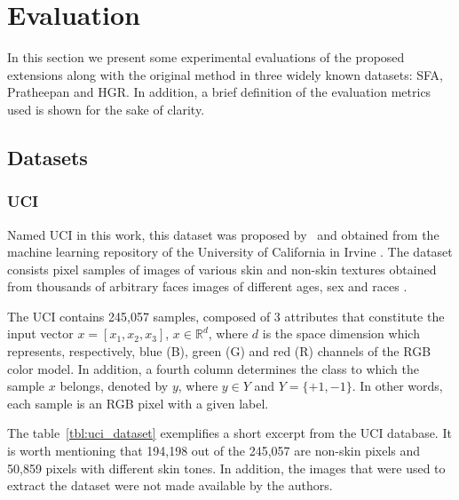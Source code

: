 \chapter{Evaluation}
\label{cap:experimentos}

In this section we present some experimental evaluations of the proposed extensions along with the original method in three widely known datasets: SFA, Pratheepan and HGR. In addition, a brief definition of the evaluation metrics used is shown for the sake of clarity.


\section{Datasets}
\label{sec:datasets}

\subsection{UCI}
\label{sec:datasets_uci}
Named UCI in this work, this dataset was proposed by~\citet{uci-skin-dataset:12} and obtained from the machine learning repository of the University of California in Irvine \citep{lichman:13}. The dataset consists pixel samples of images of various skin and non-skin textures obtained from thousands of arbitrary faces images of different ages, sex and races \citep{pal-texas:04, feret:96}.

The UCI contains 245,057 samples, composed of 3 attributes that constitute the input vector $x = [x_1, x_2, x_3]$, $x \in \mathbb{R}^{d}$, where $d$ is the space dimension which represents, respectively, blue (B), green (G) and red (R) channels of the RGB color model. In addition, a fourth column determines the class to which the sample $x$ belongs, denoted by $y$, where $y \in Y$ and $Y = \{+1, -1\}$. In other words, each sample is an RGB pixel with a given label.

The table~\ref{tbl:uci_dataset} exemplifies a short excerpt from the UCI database. It is worth mentioning that 194,198 out of the 245,057 are non-skin pixels and 50,859 pixels with different skin tones. In addition, the images that were used to extract the dataset were not made available by the authors.

